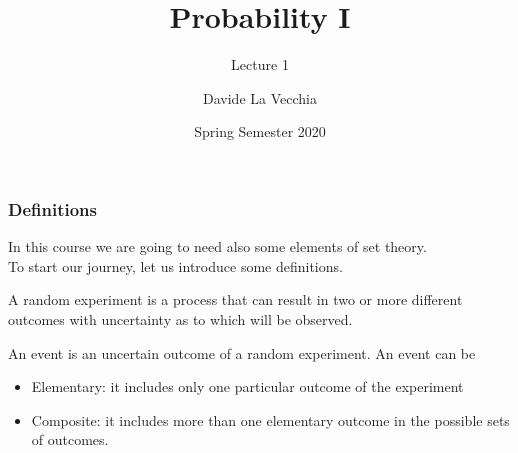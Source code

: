 \documentclass[notes=show,handout]{beamer}
\begin{document}
\title[S110015]{Probability I}
\subtitle{Lecture 1}
\author[La Vecchia]{Davide La Vecchia}
\date{Spring Semester 2020}
\maketitle



\begin{frame}
\frametitle{Definitions}

In this course we are going to need also some elements of \color{blue} set theory.\color{black}\\

To start our journey, let us introduce some definitions.

\begin{definition}
A random experiment  is a process that can result in two or more different outcomes with uncertainty as to which will be observed.
\end{definition}

\begin{definition}
An event is an uncertain outcome of a random experiment. An event can be
\begin{itemize}
\item Elementary: it includes only one particular outcome of the experiment
\item Composite: it includes more than one elementary outcome in the possible sets of outcomes.
\end{itemize}
\end{definition}

\end{frame}
\end{document}
